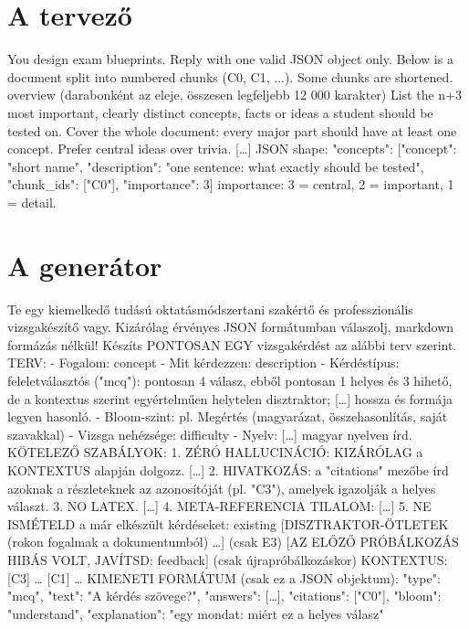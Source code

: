\section{A tervező}
\begin{kodblokk}
[planner] You design exam blueprints. Reply with one valid JSON object only.
Below is a document split into numbered chunks (C0, C1, ...). Some chunks are shortened.
{overview}                (darabonként az eleje, összesen legfeljebb 12 000 karakter)
List the {n+3} most important, clearly distinct concepts, facts or ideas a student should be
tested on. Cover the whole document: every major part should have at least one concept. Prefer
central ideas over trivia. […]
JSON shape: {"concepts": [{"concept": "short name", "description": "one sentence: what exactly
  should be tested", "chunk_ids": ["C0"], "importance": 3}]}
importance: 3 = central, 2 = important, 1 = detail.
\end{kodblokk}

\section{A generátor}
\begin{kodblokk}
[generator] Te egy kiemelkedő tudású oktatásmódszertani szakértő és professzionális vizsgakészítő
vagy. Kizárólag érvényes JSON formátumban válaszolj, markdown formázás nélkül!
Készíts PONTOSAN EGY vizsgakérdést az alábbi terv szerint.
TERV:
- Fogalom: {concept}       - Mit kérdezzen: {description}
- Kérdéstípus: feleletválasztós ("mcq"): pontosan 4 válasz, ebből pontosan 1 helyes és 3 hihető,
  de a kontextus szerint egyértelműen helytelen disztraktor; […] hossza és formája legyen hasonló.
- Bloom-szint: {pl. Megértés (magyarázat, összehasonlítás, saját szavakkal)}
- Vizsga nehézsége: {difficulty}    - Nyelv: […] {magyar} nyelven írd.
KÖTELEZŐ SZABÁLYOK:
1. ZÉRÓ HALLUCINÁCIÓ: KIZÁRÓLAG a KONTEXTUS alapján dolgozz. […]
2. HIVATKOZÁS: a "citations" mezőbe írd azoknak a részleteknek az azonosítóját (pl. "C3"),
   amelyek igazolják a helyes választ.
3. NO LATEX. […]  4. META-REFERENCIA TILALOM: […]
5. NE ISMÉTELD a már elkészült kérdéseket: {existing}
[DISZTRAKTOR-ÖTLETEK (rokon fogalmak a dokumentumból) …]          (csak E3)
[AZ ELŐZŐ PRÓBÁLKOZÁS HIBÁS VOLT, JAVÍTSD: {feedback}]             (csak újrapróbálkozáskor)
KONTEXTUS:
[C3] …
[C1] …
KIMENETI FORMÁTUM (csak ez a JSON objektum):
{"type": "mcq", "text": "A kérdés szövege?", "answers": […], "citations": ["C0"],
 "bloom": "understand", "explanation": "egy mondat: miért ez a helyes válasz"}
\end{kodblokk}

